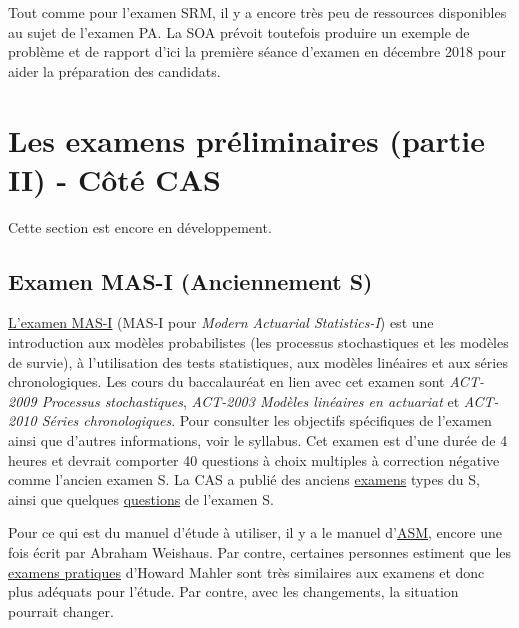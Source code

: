 Tout comme pour l'examen SRM, il y a encore très peu de ressources disponibles au sujet de l'examen PA. La SOA prévoit toutefois produire un exemple de problème et de rapport d'ici la première séance d'examen en décembre 2018 pour aider la préparation des candidats. \vspace{\baselineskip}

\newpage

\section*{Les examens préliminaires (partie II) - Côté CAS}
\label{sec:prelimssuitecas}

Cette section est encore en développement. \vspace{\baselineskip}


\subsection*{Examen MAS-I (Anciennement S)}
\label{subsec:examMAS_I}

\href{http://www.casact.org/admissions/syllabus/index.cfm?fa=MASI&parentID=391}{L'examen MAS-I} (MAS-I pour \textit{Modern Actuarial Statistics-I}) est une introduction aux modèles probabilistes (les processus stochastiques et les modèles de survie), à l'utilisation des tests statistiques, aux modèles linéaires et aux séries chronologiques. Les cours du baccalauréat en lien avec cet examen sont \textit{ACT-2009 Processus stochastiques}, \textit{ACT-2003 Modèles linéaires en actuariat} et \textit{ACT-2010 Séries chronologiques}. Pour consulter les objectifs spécifiques de l'examen ainsi que d'autres informations, voir le syllabus. Cet examen est d'une durée de 4 heures et devrait comporter 40 questions à choix multiples à correction négative comme l'ancien examen S. La CAS a publié des anciens \href{http://www.casact.org/admissions/studytools/examS/}{examens} types du S, ainsi que quelques \href{http://www.casact.org/admissions/studytools/examS/Sample_Questions.pdf}{questions} de l'examen S.\vspace{\baselineskip}

Pour ce qui est du manuel d'étude à utiliser, il y a le manuel d'\href{https://drive.google.com/open?id=0B6kXivc6X9LISGhkVUkzLW5sSnc}{ASM}, encore une fois écrit par Abraham Weishaus. Par contre, certaines personnes estiment que les \href{https://drive.google.com/open?id=0B6kXivc6X9LIOUs3SDF3NmVKNGM}{examens pratiques} d'Howard Mahler sont très similaires aux examens et donc plus adéquats pour l'étude. Par contre, avec les changements, la situation pourrait changer. \vspace{\baselineskip}



